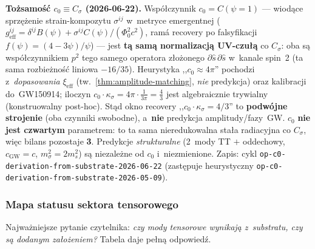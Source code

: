 \begin{remark}
\medskip\noindent\textbf{To\.zsamo\'s\'c $c_0 \equiv C_\sigma$ (2026-06-22).}
Wsp\'o\l{}czynnik $c_0 = C(\psi{=}1)$ --- wiod\k{a}ce sprz\k{e}\.zenie
strain-kompozytu $\sigma^{ij}$ w~metryce emergentnej
($g_{\mathrm{eff}}^{ij} = \delta^{ij}B(\psi) + \sigma^{ij}C(\psi)/(\Phi_0^2c^2)$,
ram\'a recovery po falsyfikacji $f(\psi)=(4-3\psi)/\psi$) --- jest
\textbf{t\k{a} sam\k{a} normalizacj\k{a} UV-czu\l{}\k{a}} co $C_\sigma$:
oba s\k{a} wsp\'o\l{}czynnikiem $p^2$ tego samego operatora z\l{}o\.zonego
$\partial\hat s\,\partial\hat s$ w~kanale spin~2 (ta sama rozbie\.zno\'s\'c
liniowa $-16/35$). Heurystyka ,,$c_0 \approx 4\pi$'' pochodzi z~\emph{dopasowania}
$\xi_{\mathrm{eff}}$ (tw.~\ref{thm:amplitude-matching}, \emph{nie} predykcja)
oraz kalibracji do~GW150914; iloczyn $c_0\cdot\kappa_\sigma = 4\pi\cdot\frac{1}{3\pi}
= \frac{4}{3}$ jest algebraicznie trywialny (konstruowalny post-hoc).
St\k{a}d okno recovery ,,$c_0\cdot\kappa_\sigma = 4/3$'' to \textbf{podw\'ojne
strojenie} (oba czynniki swobodne), a~\textbf{nie} predykcja amplitudy/fazy~GW.
$c_0$ \textbf{nie jest czwartym} parametrem: to ta sama nieredukowalna sta\l{}a
radiacyjna co $C_\sigma$, wi\k{e}c bilans pozostaje \textbf{3}. Predykcje
\emph{strukturalne} (2~mody TT $+$ oddechowy, $c_{\mathrm{GW}}=c$,
$m_\sigma^2 = 2m_s^2$) s\k{a} niezale\.zne od $c_0$ i~niezmienione.
Zapis: cykl \texttt{op-c0-derivation-from-substrate-2026-06-22}
(zast\k{e}puje heurystyczny \texttt{op-c0-derivation-from-substrate-2026-05-09}).
\end{remark}

\subsubsection{Mapa statusu sektora tensorowego}\label{sssec:sigma-status-map}

\begin{remark}\label{rem:sigma-logic}
Najwa\.zniejsze pytanie czytelnika: \emph{czy mody tensorowe wynikaj\k{a}
z~substratu, czy s\k{a} dodanym za\l{}o\.zeniem?}
Tabela daje pe\l{}n\k{a} odpowied\'z.
\end{remark}

